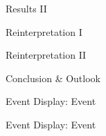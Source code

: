 \documentclass[11pt, xcolor={dvipsnames}, aspectratio=169]{beamer}
\begin{document}
\begin{frame}{Results II}
\end{frame}


\begin{frame}{Reinterpretation I}
\end{frame}


\begin{frame}{Reinterpretation II}
\end{frame}


\begin{frame}{Conclusion \& Outlook}
\end{frame}


\begin{frame}{Event Display: \hadhad Event}
\end{frame}


\begin{frame}{Event Display: \lephad Event}
\end{frame}

\end{document}
